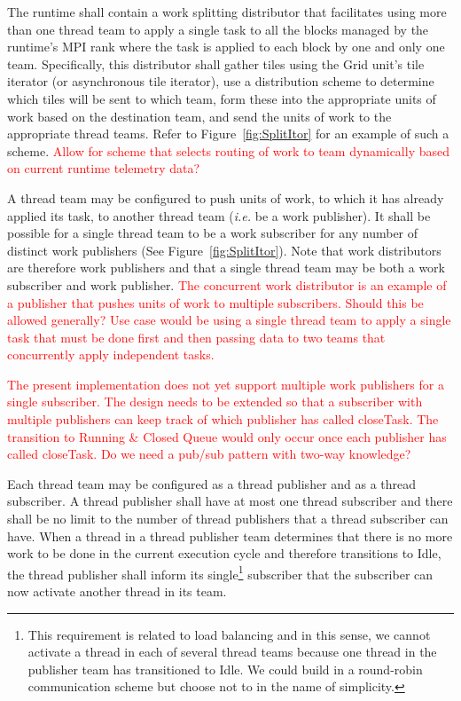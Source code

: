 \documentclass{article}
\begin{document}
\begin{req}
The runtime shall contain a work splitting distributor that facilitates
using more than one thread team to apply a single task to all the
blocks managed by the runtime's MPI rank where the task is applied to
each block by one and only one team.  Specifically, this distributor shall
gather tiles using the Grid unit's tile iterator (or asynchronous tile
iterator), use a distribution scheme to determine which tiles will be sent to
which team, form these into the appropriate units of work based on the
destination team, and send the units of work to the appropriate thread teams.
Refer to Figure~\ref{fig:SplitItor} for an example of such a scheme.
\textcolor{red}{Allow for scheme that selects routing of work to team
dynamically based on current runtime telemetry data?}
\end{req}

\begin{req}
A thread team may be configured to push units of work, to which it has already
applied its task, to another thread team (\textit{i.e.} be a work publisher).
It shall be possible for a single thread
team to be a work subscriber for any number of distinct work
publishers (See Figure~\ref{fig:SplitItor}).  Note that work
distributors are therefore work publishers and that a single thread team may be
both a work subscriber and work publisher.  \textcolor{red}{The concurrent work
distributor is an example of a publisher that pushes units of work to multiple
subscribers.  Should this be allowed generally?  Use case would be using a
single thread team to apply a single task that must be done first and then
passing data to two teams that concurrently apply independent tasks.}
\end{req}

\textcolor{red}{The present implementation does not yet support multiple work
publishers for a single subscriber.  The design needs to be extended so that
a subscriber with multiple publishers can keep track of which publisher has
called closeTask.  The transition to Running \& Closed Queue would only occur
once each publisher has called closeTask.  Do we need a pub/sub pattern with
two-way knowledge?}

\begin{req}
\label{req:ThreadSubPub}
Each thread team may be configured as a thread publisher and as a
thread subscriber.  A thread publisher shall have at most one thread
subscriber and there shall be no limit to the number of thread publishers that a
thread subscriber can have.  When a thread in a thread publisher team determines
that there is no more work to be done in the current execution cycle and
therefore transitions to Idle, the thread publisher shall inform its
single\footnote{This requirement is related to load balancing and in this sense,
we cannot activate a thread in each of several thread teams because one thread
in the publisher team has transitioned to Idle.  We could build in a round-robin communication
scheme but choose not to in the name of simplicity.} subscriber that the
subscriber can now activate another thread in its team.
\end{req}
\end{document}
